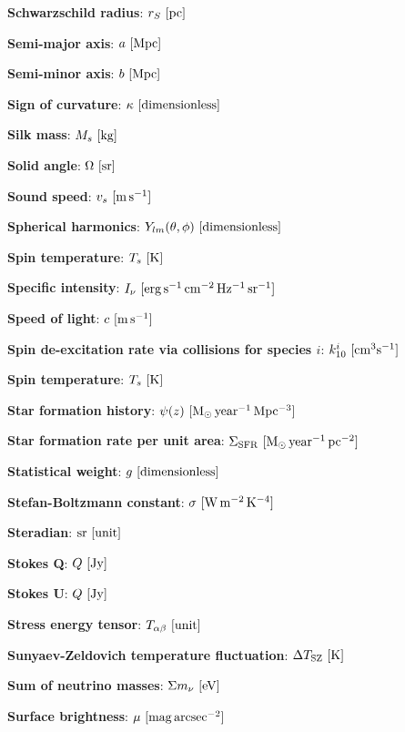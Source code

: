 \documentclass[a4paper,11pt]{article}
\begin{document}
{\noindent}\textbf{Schwarzschild radius}: $r_S ~ [{\rm pc}]$

{\noindent}\textbf{Semi-major axis}: $a ~ [{\rm Mpc}]$

{\noindent}\textbf{Semi-minor axis}: $b ~ [{\rm Mpc}]$

{\noindent}\textbf{Sign of curvature}: $\kappa ~ [{\rm dimensionless}]$

{\noindent}\textbf{Silk mass}: $M_s ~ [{\rm kg}]$

{\noindent}\textbf{Solid angle}: $\Omega ~ [{\rm sr}]$

{\noindent}\textbf{Sound speed}: $v_s ~ [{\rm m\,s^{-1}}]$

{\noindent}\textbf{Spherical harmonics}: $Y_{lm}(\theta,\phi) ~ [{\rm dimensionless}]$

{\noindent}\textbf{Spin temperature}: $T_s ~ [{\rm K}]$

{\noindent}\textbf{Specific intensity}: $I_\nu ~ [{\rm erg\,s^{-1}\,cm^{-2}\,Hz^{-1}\,sr^{-1}}]$

{\noindent}\textbf{Speed of light}: $c ~ [{\rm m\,s^{-1}}]$

{\noindent}\textbf{Spin de-excitation rate via collisions for species $i$}: $k_{10}^i ~ [{\rm cm^3s^{-1}}]$

{\noindent}\textbf{Spin temperature}: $T_s ~ [{\rm K}]$

{\noindent}\textbf{Star formation history}: $\psi(z) ~ [{\rm M_\odot\,year^{-1}\,Mpc^{-3}}]$

{\noindent}\textbf{Star formation rate per unit area}: $\Sigma_\mathrm{SFR} ~ [{\rm M_\odot\,year^{-1}\,pc^{-2}}]$

{\noindent}\textbf{Statistical weight}: $g ~ [{\rm dimensionless}]$

{\noindent}\textbf{Stefan-Boltzmann constant}: $\sigma ~ [{\rm W\,m^{-2}\,K^{-4}}]$

{\noindent}\textbf{Steradian}: ${\rm sr} ~ [{\rm unit}]$

{\noindent}\textbf{Stokes Q}: $Q ~ [{\rm Jy}]$

{\noindent}\textbf{Stokes U}: $Q ~ [{\rm Jy}]$

{\noindent}\textbf{Stress energy tensor}: $T_{\alpha\beta} ~ [{\rm unit}]$

{\noindent}\textbf{Sunyaev-Zeldovich temperature fluctuation}: $\Delta T_\mathrm{SZ} ~ [{\rm K}]$

{\noindent}\textbf{Sum of neutrino masses}: $\Sigma m_\nu ~ [{\rm eV}]$

{\noindent}\textbf{Surface brightness}: $\mu ~ [{\rm mag\,arcsec^{-2}}]$
\end{document}
